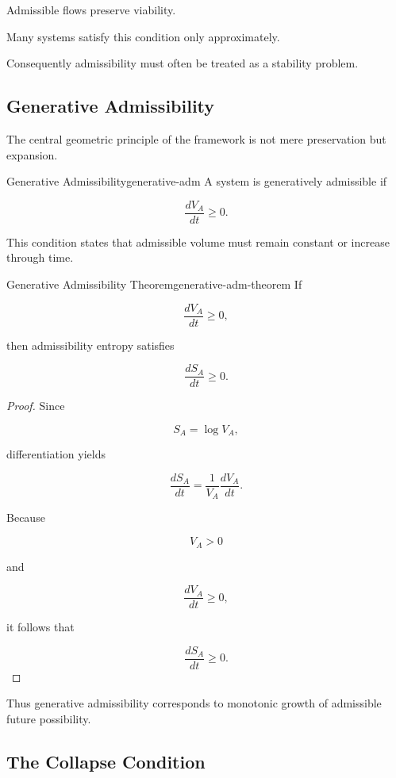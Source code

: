\documentclass[12pt,twoside,openright]{book}
\begin{document}
Admissible flows preserve viability.

Many systems satisfy this condition only approximately.

Consequently admissibility must often be treated as a
stability problem.

\subsection{Generative Admissibility}

The central geometric principle of the framework is not
mere preservation but expansion.

\begin{definition}{Generative Admissibility}{generative-adm}
A system is generatively admissible if

\[
\frac{dV_A}{dt}
\ge
0.
\]
\end{definition}

This condition states that admissible volume must remain
constant or increase through time.

\begin{theorem}{Generative Admissibility Theorem}{generative-adm-theorem}
If

\[
\frac{dV_A}{dt}
\ge0,
\]

then admissibility entropy satisfies

\[
\frac{dS_A}{dt}
\ge0.
\]
\end{theorem}

\begin{proof}
Since

\[
S_A
=

\log V_A,
\]

differentiation yields

\[
\frac{dS_A}{dt}
=

\frac1{V_A}
\frac{dV_A}{dt}.
\]

Because

\[
V_A>0
\]

and

\[
\frac{dV_A}{dt}\ge0,
\]

it follows that

\[
\frac{dS_A}{dt}
\ge0.
\]
\end{proof}

Thus generative admissibility corresponds to monotonic
growth of admissible future possibility.

\subsection{The Collapse Condition}
\end{document}
